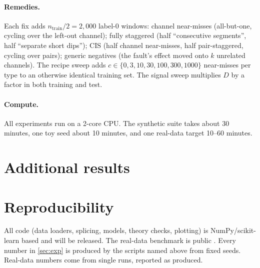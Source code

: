 \paragraph{Remedies.} Each fix adds $n_{\mathrm{train}}/2=2{,}000$ label-0 windows: channel near-misses (all-but-one, cycling over the left-out channel); fully staggered (half ``consecutive segments'', half ``separate short dips''); CIS (half channel near-misses, half pair-staggered, cycling over pairs); generic negatives (the fault's effect moved onto $k$ unrelated channels). The recipe sweep adds $c\in\{0,3,10,30,100,300,1000\}$ near-misses per type to an otherwise identical training set. The signal sweep multiplies $D$ by a factor in both training and test.

\paragraph{Compute.} All experiments run on a 2-core CPU. The synthetic suite takes about 30 minutes, one toy seed about 10 minutes, and one real-data target 10--60 minutes.

\section{Additional results}
\label{app:more}


\section{Reproducibility}
All code (data loaders, splicing, models, theory checks, plotting) is NumPy/scikit-learn based and will be released. The real-data benchmark is public \citep{granderson2023}. Every number in \cref{sec:exp} is produced by the scripts named above from fixed seeds. Real-data numbers come from single runs, reported as produced.
